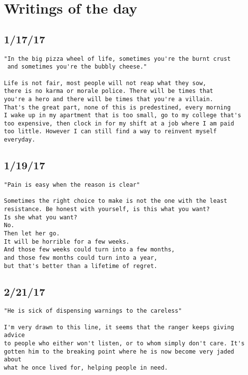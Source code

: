 \documentclass[12pt,letterpaper]{article}
\begin{document}
\newpage
\section{Writings of the day}
\subsection*{1/17/17}
\begin{verbatim}
"In the big pizza wheel of life, sometimes you're the burnt crust
 and sometimes you're the bubbly cheese."

Life is not fair, most people will not reap what they sow, 
there is no karma or morale police. There will be times that
you're a hero and there will be times that you're a villain.
That's the great part, none of this is predestined, every morning 
I wake up in my apartment that is too small, go to my college that's
too expensive, then clock in for my shift at a job where I am paid 
too little. However I can still find a way to reinvent myself everyday.
\end{verbatim}


\subsection*{1/19/17}
\begin{verbatim}
"Pain is easy when the reason is clear"

Sometimes the right choice to make is not the one with the least
resistance. Be honest with yourself, is this what you want?
Is she what you want?
No. 
Then let her go. 
It will be horrible for a few weeks.
And those few weeks could turn into a few months, 
and those few months could turn into a year,
but that's better than a lifetime of regret. 
\end{verbatim}

\subsection*{2/21/17}
\begin{verbatim}
"He is sick of dispensing warnings to the careless"

I'm very drawn to this line, it seems that the ranger keeps giving advice
to people who either won't listen, or to whom simply don't care. It's
gotten him to the breaking point where he is now become very jaded about
what he once lived for, helping people in need.
\end{verbatim}
\end{document}
